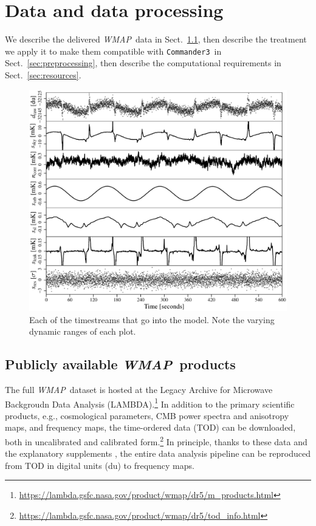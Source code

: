 \documentclass[twocolumn]{../../common/aa}
\def\WMAP{\emph{WMAP}}
\def\commanderthree{\texttt{Commander3}}
\begin{document}
\section{Data and data processing}
\label{sec:data}

We describe the delivered \WMAP\ data in Sect.~\ref{sec:products}, then describe the treatment we apply it to make them compatible with \commanderthree\ in Sect.~\ref{sec:preprocessing}, then describe the computational requirements in Sect.~\ref{sec:resources}.

\begin{figure}
	\includegraphics[width=\textwidth]{figures/K113_timestreams.pdf}
	\caption{Each of the timestreams that go into the model. Note the varying dynamic ranges of each plot.}
	\label{fig:timestreams}
\end{figure}

\subsection{Publicly available \WMAP\ products}
\label{sec:products}

The full \WMAP\ dataset is hosted at the Legacy Archive for Microwave Backgroudn Data Analysis (LAMBDA).\footnote{\url{https://lambda.gsfc.nasa.gov/product/wmap/dr5/m_products.html}} In addition to the primary scientific products, e.g., cosmological parameters, CMB power spectra and anisotropy maps, and frequency maps, the time-ordered data (TOD) can be downloaded, both in uncalibrated and calibrated form.\footnote{\url{https://lambda.gsfc.nasa.gov/product/wmap/dr5/tod_info.html}} In principle, thanks to these data and the explanatory supplements \citep{wmapexsupp}, the entire data analysis pipeline can be reproduced from TOD in digital units (du) to frequency maps.
\end{document}
